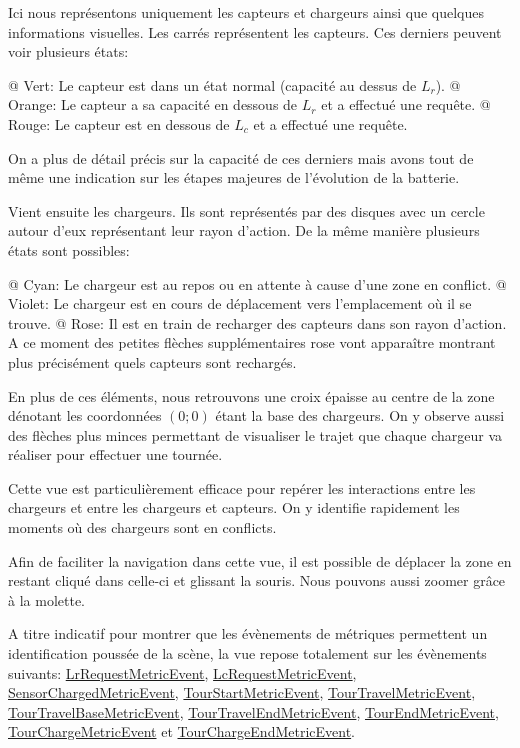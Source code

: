 \documentclass[final]{polytech/polytech}
\newcommand{\klass}[1]{\hyperref[class:#1]{#1}}
\begin{document}
				Ici nous représentons uniquement les capteurs et chargeurs ainsi que quelques informations visuelles.
				Les carrés représentent les capteurs.
				Ces derniers peuvent voir plusieurs états:
				\begin{easylist}
					@ Vert: Le capteur est dans un état normal (capacité au dessus de $L_r$).
					@ Orange: Le capteur a sa capacité en dessous de $L_r$ et a effectué une requête.
					@ Rouge: Le capteur est en dessous de $L_c$ et a effectué une requête.
				\end{easylist}
				
				On a plus de détail précis sur la capacité de ces derniers mais avons tout de même une indication sur les étapes majeures de l'évolution de la batterie.
				
				Vient ensuite les chargeurs.
				Ils sont représentés par des disques avec un cercle autour d'eux représentant leur rayon d'action.
				De la même manière plusieurs états sont possibles:
				\begin{easylist}
					@ Cyan: Le chargeur est au repos ou en attente à cause d'une zone en conflict.
					@ Violet: Le chargeur est en cours de déplacement vers l'emplacement où il se trouve.
					@ Rose: Il est en train de recharger des capteurs dans son rayon d'action. A ce moment des petites flèches supplémentaires rose vont apparaître montrant plus précisément quels capteurs sont rechargés.
				\end{easylist}
				
				En plus de ces éléments, nous retrouvons une croix épaisse au centre de la zone dénotant les coordonnées $\left( 0;0\right)$ étant la base des chargeurs.
				On y observe aussi des flèches plus minces permettant de visualiser le trajet que chaque chargeur va réaliser pour effectuer une tournée.
				
				Cette vue est particulièrement efficace pour repérer les interactions entre les chargeurs et entre les chargeurs et capteurs.
				On y identifie rapidement les moments où des chargeurs sont en conflicts.
				
				Afin de faciliter la navigation dans cette vue, il est possible de déplacer la zone en restant cliqué dans celle-ci et glissant la souris.
				Nous pouvons aussi zoomer grâce à la molette.
				
				A titre indicatif pour montrer que les évènements de métriques permettent un identification poussée de la scène, la vue repose totalement sur les évènements suivants: \klass{LrRequestMetricEvent}, \klass{LcRequestMetricEvent}, \klass{SensorChargedMetricEvent}, \klass{TourStartMetricEvent}, \klass{TourTravelMetricEvent}, \klass{TourTravelBaseMetricEvent}, \klass{TourTravelEndMetricEvent}, \klass{TourEndMetricEvent}, \klass{TourChargeMetricEvent} et \klass{TourChargeEndMetricEvent}.
	
\end{document}
